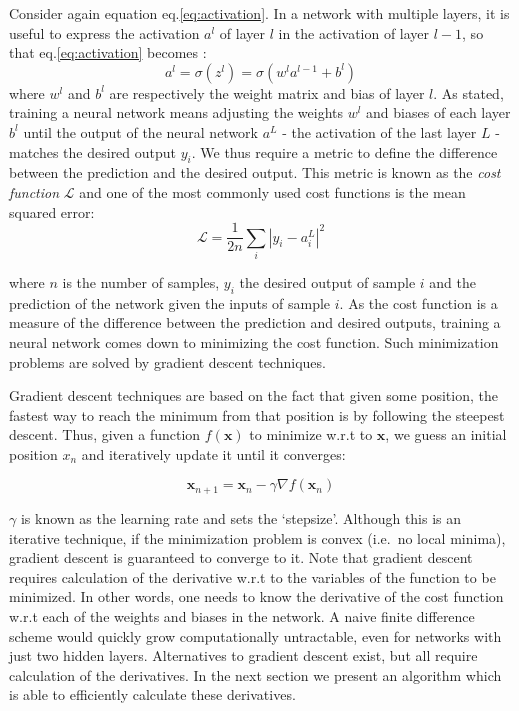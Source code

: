 \documentclass{Dissertate}
\begin{document}
Consider again equation eq.\ref{eq:activation}. In a network with
multiple layers, it is useful to express the activation \(a^l\) of layer
\(l\) in the activation of layer \(l-1\), so that
eq.\ref{eq:activation} becomes : \begin{equation}
a^l = \sigma(z^l) = \sigma(w^la^{l-1}+b^l)
\label{eq:weighted_input}\end{equation} where \(w^l\) and \(b^l\) are
respectively the weight matrix and bias of layer \(l\). As stated,
training a neural network means adjusting the weights \(w^l\) and biases
of each layer \(b^{l}\) until the output of the neural network \(a^L\) -
the activation of the last layer \(L\) - matches the desired output
\(y_i\). We thus require a metric to define the difference between the
prediction and the desired output. This metric is known as the
\emph{cost function} \(\mathcal{L}\) and one of the most commonly used
cost functions is the mean squared error: \begin{equation}
\mathcal{L} = \frac{1}{2n}\sum_i|y_i-a^L_i|^2
\label{eq:MSE}\end{equation}

where \(n\) is the number of samples, \(y_i\) the desired output of
sample \(i\) and the prediction of the network given the inputs of
sample \(i\). As the cost function is a measure of the difference
between the prediction and desired outputs, training a neural network
comes down to minimizing the cost function. Such minimization problems
are solved by gradient descent techniques.

Gradient descent techniques are based on the fact that given some
position, the fastest way to reach the minimum from that position is by
following the steepest descent. Thus, given a function \(f(\mathbf{x})\)
to minimize w.r.t to \(\mathbf{x}\), we guess an initial position
\(x_n\) and iteratively update it until it converges:

\begin{equation}
\mathbf{x}_{n+1} = \mathbf{x}_{n}-\gamma\nabla f(\mathbf{x}_n)
\label{eq:gradientdescent}\end{equation}

\(\gamma\) is known as the learning rate and sets the `stepsize'.
Although this is an iterative technique, if the minimization problem is
convex (i.e.~no local minima), gradient descent is guaranteed to
converge to it. Note that gradient descent requires calculation of the
derivative w.r.t to the variables of the function to be minimized. In
other words, one needs to know the derivative of the cost function w.r.t
each of the weights and biases in the network. A naive finite difference
scheme would quickly grow computationally untractable, even for networks
with just two hidden layers. Alternatives to gradient descent exist, but
all require calculation of the derivatives. In the next section we
present an algorithm which is able to efficiently calculate these
derivatives.
\end{document}
